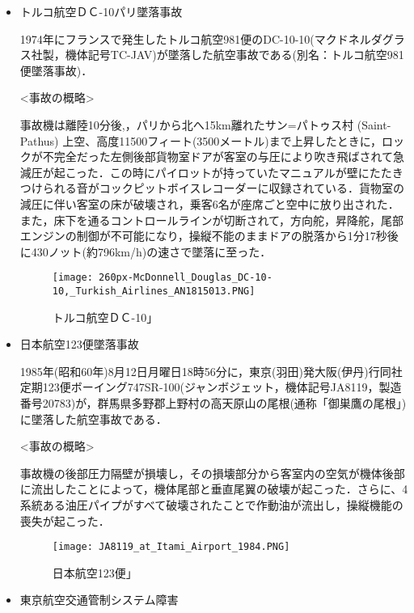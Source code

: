{\begin{itemize}
\begin{figure}[H]
\centering
\texttt{[image: challenger\_explosion.PNG]}
\caption{チャレンジャー号爆発」}\label{サンプル図}
\end{figure}


  \item トルコ航空ＤＣ-10パリ墜落事故

1974年にフランスで発生したトルコ航空981便のDC-10-10(マクドネルダグラス社製，機体記号TC-JAV)が墜落した航空事故である(別名：トルコ航空981便墜落事故)．

<事故の概略>

事故機は離陸10分後,，パリから北へ15km離れたサン=パトゥス村 (Saint-Pathus) 上空、高度11500フィート(3500メートル)まで上昇したときに，ロックが不完全だった左側後部貨物室ドアが客室の与圧により吹き飛ばされて急減圧が起こった．この時にパイロットが持っていたマニュアルが壁にたたきつけられる音がコックピットボイスレコーダーに収録されている．貨物室の減圧に伴い客室の床が破壊され，乗客6名が座席ごと空中に放り出された．また，床下を通るコントロールラインが切断されて，方向舵，昇降舵，尾部エンジンの制御が不可能になり，操縦不能のままドアの脱落から1分17秒後に430ノット(約796km/h)の速さで墜落に至った\cite{toruko}．


\begin{figure}[H]
\centering
\texttt{[image: 260px-McDonnell\_Douglas\_DC-10-10,\_Turkish\_Airlines\_AN1815013.PNG]}
\caption{トルコ航空ＤＣ-10」}\label{サンプル図}
\end{figure}


  \item 日本航空123便墜落事故

1985年(昭和60年)8月12日月曜日18時56分に，東京(羽田)発大阪(伊丹)行同社定期123便ボーイング747SR-100(ジャンボジェット，機体記号JA8119，製造番号20783)が，群馬県多野郡上野村の高天原山の尾根(通称「御巣鷹の尾根」)に墜落した航空事故である．

<事故の概略>      

事故機の後部圧力隔壁が損壊し，その損壊部分から客室内の空気が機体後部に流出したことによって，機体尾部と垂直尾翼の破壊が起こった．さらに、4系統ある油圧パイプがすべて破壊されたことで作動油が流出し，操縦機能の喪失が起こった\cite{nihon}．

\begin{figure}[H]
\centering
\texttt{[image: JA8119\_at\_Itami\_Airport\_1984.PNG]}
\caption{日本航空123便」}\label{サンプル図}
\end{figure}


  \item 東京航空交通管制システム障害


\end{itemize}}
